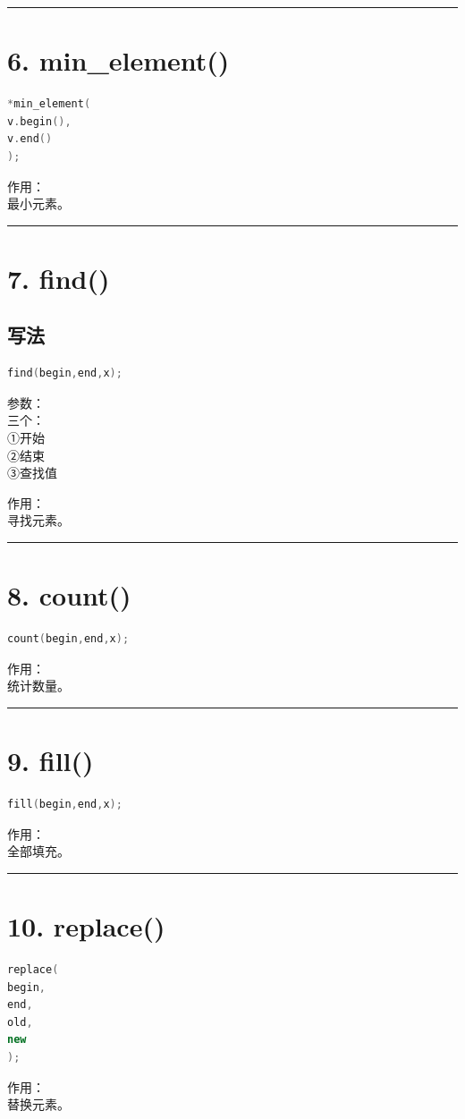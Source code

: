 \documentclass[10pt,twocolumn]{extarticle}
\begin{document}
\noindent\rule{\linewidth}{0.4pt}

\section{6. min\_element()}
\begin{lstlisting}[language=C++]
*min_element(
v.begin(),
v.end()
);
\end{lstlisting}
作用：\\
最小元素。

\noindent\rule{\linewidth}{0.4pt}

\section{7. find()}

\subsection{写法}
\begin{lstlisting}[language=C++]
find(begin,end,x);
\end{lstlisting}
参数：\\
三个：\\
①开始\\
②结束\\
③查找值

作用：\\
寻找元素。

\noindent\rule{\linewidth}{0.4pt}

\section{8. count()}
\begin{lstlisting}[language=C++]
count(begin,end,x);
\end{lstlisting}
作用：\\
统计数量。

\noindent\rule{\linewidth}{0.4pt}

\section{9. fill()}
\begin{lstlisting}[language=C++]
fill(begin,end,x);
\end{lstlisting}
作用：\\
全部填充。

\noindent\rule{\linewidth}{0.4pt}

\section{10. replace()}
\begin{lstlisting}[language=C++]
replace(
begin,
end,
old,
new
);
\end{lstlisting}
作用：\\
替换元素。
\end{document}
